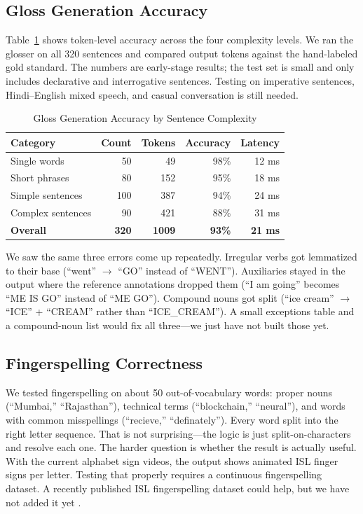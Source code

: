 \documentclass[conference]{IEEEtran}
\begin{document}
\subsection{Gloss Generation Accuracy}

Table~\ref{tab:gloss} shows token-level accuracy across the four complexity levels. We ran the glosser on all 320 sentences and compared output tokens against the hand-labeled gold standard. The numbers are early-stage results; the test set is small and only includes declarative and interrogative sentences. Testing on imperative sentences, Hindi--English mixed speech, and casual conversation is still needed.

\begin{table}[t]
\centering
\caption{Gloss Generation Accuracy by Sentence Complexity}
\label{tab:gloss}
\begin{tabular}{@{}lrrrr@{}}
\toprule
\textbf{Category} & \textbf{Count} & \textbf{Tokens} & \textbf{Accuracy} & \textbf{Latency} \\
\midrule
Single words & 50 & 49 & 98\% & 12 ms \\
Short phrases & 80 & 152 & 95\% & 18 ms \\
Simple sentences & 100 & 387 & 94\% & 24 ms \\
Complex sentences & 90 & 421 & 88\% & 31 ms \\
\midrule
\textbf{Overall} & \textbf{320} & \textbf{1009} & \textbf{93\%} & \textbf{21 ms} \\
\bottomrule
\end{tabular}
\end{table}

We saw the same three errors come up repeatedly. Irregular verbs got lemmatized to their base (``went'' $\rightarrow$ ``GO'' instead of ``WENT''). Auxiliaries stayed in the output where the reference annotations dropped them (``I am going'' becomes ``ME IS GO'' instead of ``ME GO''). Compound nouns got split (``ice cream'' $\rightarrow$ ``ICE'' + ``CREAM'' rather than ``ICE\_CREAM''). A small exceptions table and a compound-noun list would fix all three---we just have not built those yet.

\subsection{Fingerspelling Correctness}

We tested fingerspelling on about 50 out-of-vocabulary words: proper nouns (``Mumbai,'' ``Rajasthan''), technical terms (``blockchain,'' ``neural''), and words with common misspellings (``recieve,'' ``definately''). Every word split into the right letter sequence. That is not surprising---the logic is just split-on-characters and resolve each one. The harder question is whether the result is actually useful. With the current alphabet sign videos, the output shows animated ISL finger signs per letter. Testing that properly requires a continuous fingerspelling dataset. A recently published ISL fingerspelling dataset could help, but we have not added it yet \cite{kirandevraj2025}.
\end{document}
